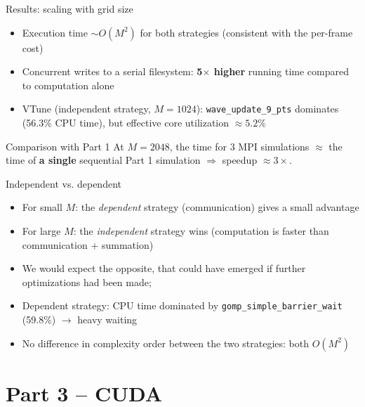 \documentclass[11pt,aspectratio=169]{beamer}
\begin{document}
\begin{frame}{Results: scaling with grid size}
  \begin{itemize}
    \item Execution time $\sim O(M^2)$ for both strategies
      (consistent with the per-frame cost)
    \item Concurrent writes to a serial filesystem: \textbf{5$\times$
      higher} running time compared to computation alone
    \item VTune (independent strategy, $M=1024$):
      \texttt{wave\_update\_9\_pts} dominates (56.3\% CPU time),
      but effective core utilization $\approx 5.2\%$
  \end{itemize}
  \begin{exampleblock}{Comparison with Part 1}
    At $M=2048$, the time for 3 MPI simulations $\approx$ the time of
    \textbf{a single} sequential Part 1 simulation
    $\Rightarrow$ speedup $\approx 3\times$.
  \end{exampleblock}
\end{frame}

\begin{frame}{Independent vs. dependent}
  \begin{itemize}
    \item For small $M$: the \emph{dependent} strategy (communication)
      gives a small advantage
    \item For large $M$: the \emph{independent} strategy wins
      (computation is faster than communication + summation)
    \item We would expect the opposite, that could have emerged if further
      optimizations had been made;
    \item Dependent strategy: CPU time dominated by
      \texttt{gomp\_simple\_barrier\_wait} (59.8\%) $\to$ heavy waiting
    \item No difference in complexity order between the two
      strategies: both $O(M^2)$
  \end{itemize}
\end{frame}

\section{Part 3 -- CUDA}
\end{document}
